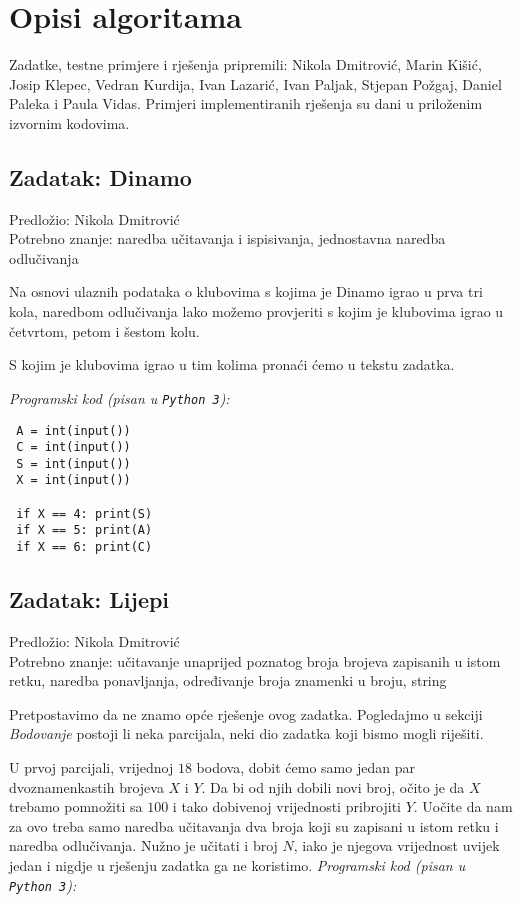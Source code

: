 \documentclass[a4paper]{article}
\begin{document}
\section*{Opisi algoritama}
Zadatke, testne primjere i rješenja pripremili: Nikola Dmitrović, Marin Kišić,
Josip Klepec, Vedran Kurdija, Ivan Lazarić, Ivan Paljak, Stjepan Požgaj, Daniel Paleka i
Paula Vidas. Primjeri implementiranih rješenja su dani u priloženim izvornim
kodovima.

\subsection*{Zadatak: Dinamo}
\textsf{Predložio: Nikola Dmitrović}\\
\textsf{Potrebno znanje: naredba učitavanja i ispisivanja, jednostavna naredba
odlučivanja}

Na osnovi ulaznih podataka o klubovima s kojima je Dinamo igrao u prva tri kola,
naredbom odlučivanja lako možemo provjeriti s kojim je klubovima igrao u
četvrtom, petom i šestom kolu.

S kojim je klubovima igrao u tim kolima pronaći ćemo u tekstu zadatka.

\textit{Programski kod (pisan u \texttt{Python 3}):}

\vspace{-2ex}
\begin{verbatim}
 A = int(input())
 C = int(input())
 S = int(input())
 X = int(input())

 if X == 4: print(S)
 if X == 5: print(A)
 if X == 6: print(C)
\end{verbatim}

\subsection*{Zadatak: Lijepi}
\textsf{Predložio: Nikola Dmitrović}\\
\textsf{Potrebno znanje: učitavanje unaprijed poznatog broja brojeva zapisanih
u istom retku, naredba ponavljanja, određivanje broja znamenki u broju, string}

Pretpostavimo da ne znamo opće rješenje ovog zadatka. Pogledajmo u sekciji
\textit{Bodovanje} postoji li neka parcijala, neki dio zadatka koji bismo mogli
riješiti.

U prvoj parcijali, vrijednoj $18$ bodova, dobit ćemo samo jedan par
dvoznamenkastih brojeva $X$ i $Y$. Da bi od njih dobili novi broj, očito je da
$X$ trebamo pomnožiti sa $100$ i tako dobivenoj vrijednosti pribrojiti $Y$.
Uočite da nam za ovo treba samo naredba učitavanja dva broja koji su zapisani u
istom retku i naredba odlučivanja. Nužno je učitati i broj $N$, iako je njegova
vrijednost uvijek jedan i nigdje u rješenju zadatka ga ne koristimo.
\textit{Programski kod (pisan u \texttt{Python 3}):}
\end{document}
